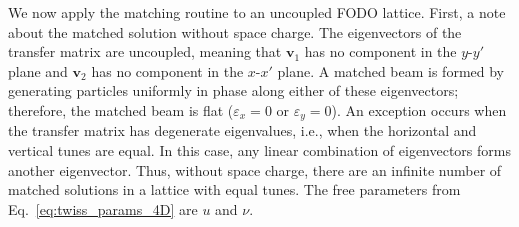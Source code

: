 We now apply the matching routine to an uncoupled FODO lattice. First, a note about the matched solution without space charge. The eigenvectors of the transfer matrix are uncoupled, meaning that $\mathbf{v}_1$ has no component in the $y$-$y'$ plane and $\mathbf{v}_2$ has no component in the $x$-$x'$ plane. A matched beam is formed by generating particles uniformly in phase along either of these eigenvectors; therefore, the matched beam is flat ($\varepsilon_x = 0$ or $\varepsilon_y = 0$). An exception occurs when the transfer matrix has degenerate eigenvalues, i.e., when the horizontal and vertical tunes are equal. In this case, any linear combination of eigenvectors forms another eigenvector. Thus, without space charge, there are an infinite number of matched solutions in a lattice with equal tunes. The free parameters from Eq.~\eqref{eq:twiss_params_4D} are $u$ and $\nu$.

